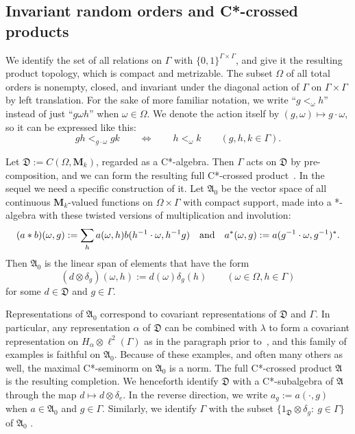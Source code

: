 \documentclass[12pt,a4paper]{article}
\numberwithin{equation}{section}
\theoremstyle{remark}
\newcommand{\rmM}{\mathbf{M}}
\newcommand{\A}{\mathfrak{A}}
\newcommand{\frD}{\mathfrak{D}}
\newcommand{\G}{\Gamma}
\renewcommand{\a}{\alpha}
\renewcommand{\l}{\lambda}
\begin{document}
\subsection{Invariant random orders and C*-crossed products}\label{subs:inv-rndm}

We identify the set of all relations on $\G$ with $\{0,1\}^{\G\times \G}$, and give it the resulting product topology, which is compact and metrizable.  The subset $\Omega$ of all total orders is nonempty, closed, and invariant under the diagonal action of $\G$ on $\G\times \G$ by left translation.  For the sake of more familiar notation, we write ``$g <_\omega h$'' instead of just ``$g \omega h$'' when $\omega \in \Omega$.  We denote the action itself by $(g,\omega) \mapsto g\cdot \omega$, so it can be expressed like this:
\begin{equation}\label{eq:order-equiv}
gh <_{g\cdot \omega} gk \qquad \Leftrightarrow \qquad h <_\omega k \qquad (g,h,k \in \G).
\end{equation}

Let $\frD:= C(\Omega,\rmM_k)$, regarded as a C*-algebra.  Then $\G$ acts on $\frD$ by pre-composition, and we can form the resulting full C*-crossed product~\cite[Sec. 4.1]{BroOza08}.  In the sequel we need a specific construction of it.  Let $\A_0$ be the vector space of all continuous $\rmM_k$-valued functions on $\Omega\times \G$ with compact support, made into a *-algebra with these twisted versions of multiplication and involution:
\begin{equation}\label{eq:twisted}
(a\ast b)(\omega,g) := \sum_h a(\omega,h)b(h^{-1}\cdot \omega,h^{-1}g) \quad \hbox{and} \quad a^\ast(\omega,g) := a(g^{-1}\cdot \omega,g^{-1})^\ast.
\end{equation}
Then $\A_0$ is the linear span of elements that have the form
\[(d\otimes \delta_g)(\omega,h) := d(\omega)\delta_g(h) \qquad (\omega \in \Omega, h \in \G)\]
for some $d \in \frD$ and $g \in \G$.

Representations of $\A_0$ correspond to covariant representations of $\frD$ and $\G$. In particular, any representation $\a$ of $\frD$ can be combined with $\l$ to form a covariant representation on $H_\a\otimes \ell^2(\G)$ as in the paragraph prior to~\cite[Def. 4.1.4]{BroOza08}, and this family of examples is faithful on $\A_0$.  Because of these examples, and often many others as well, the maximal C*-seminorm on $\A_0$ is a norm.  The full C*-crossed product $\A$ is the resulting completion.  We henceforth identify $\frD$ with a C*-subalgebra of $\A$ through the map $d \mapsto d\otimes \delta_e$.  In the reverse direction, we write $a_g := a(\cdot,g)$ when $a \in \A_0$ and $g \in \G$.  Similarly, we identify $\G$ with the subset $\{1_\frD\otimes \delta_g:\ g \in \G\}$ of $\A_0$ .
\end{document}
